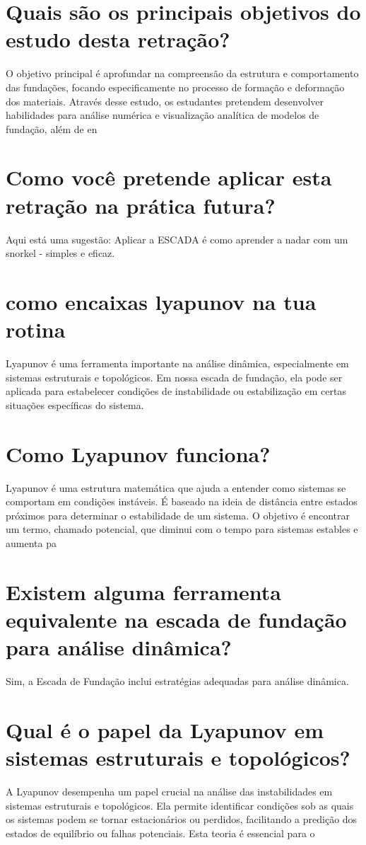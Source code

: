 \documentclass[11pt,a4paper]{article}
\begin{document}
\section{Quais são os principais objetivos do estudo desta retração?}
O objetivo principal é aprofundar na compreensão da estrutura e comportamento das fundações, focando especificamente no processo de formação e deformação dos materiais. Através desse estudo, os estudantes pretendem desenvolver habilidades para análise numérica e visualização analítica de modelos de fundação, além de en

\section{Como você pretende aplicar esta retração na prática futura?}
Aqui está uma sugestão: Aplicar a ESCADA é como aprender a nadar com um snorkel - simples e eficaz.

\section{como encaixas lyapunov na tua rotina}
Lyapunov é uma ferramenta importante na análise dinâmica, especialmente em sistemas estruturais e topológicos. Em nossa escada de fundação, ela pode ser aplicada para estabelecer condições de instabilidade ou estabilização em certas situações específicas do sistema.

\section{Como Lyapunov funciona?}
Lyapunov é uma estrutura matemática que ajuda a entender como sistemas se comportam em condições instáveis. É baseado na ideia de distância entre estados próximos para determinar o estabilidade de um sistema. O objetivo é encontrar um termo, chamado potencial, que diminui com o tempo para sistemas estables e aumenta pa

\section{Existem alguma ferramenta equivalente na escada de fundação para análise dinâmica?}
Sim, a Escada de Fundação inclui estratégias adequadas para análise dinâmica.

\section{Qual é o papel da Lyapunov em sistemas estruturais e topológicos?}
A Lyapunov desempenha um papel crucial na análise das instabilidades em sistemas estruturais e topológicos. Ela permite identificar condições sob as quais os sistemas podem se tornar estacionários ou perdidos, facilitando a predição dos estados de equilíbrio ou falhas potenciais. Esta teoria é essencial para o
\end{document}
